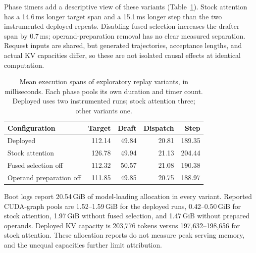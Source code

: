 Phase timers add a descriptive view of these variants (Table~\ref{tab:optimization-spans}). Stock attention has a 14.6\,ms longer target span and a 15.1\,ms longer step than the two instrumented deployed repeats. Disabling fused selection increases the drafter span by 0.7\,ms; operand-preparation removal has no clear measured separation. Request inputs are shared, but generated trajectories, acceptance lengths, and actual KV capacities differ, so these are not isolated causal effects at identical computation.

\begin{table}[t]
\caption{Mean execution spans of exploratory replay variants, in milliseconds. Each phase pools its own duration and timer count. Deployed uses two instrumented runs; stock attention three; other variants one.}
\label{tab:optimization-spans}
\centering\small
\setlength{\tabcolsep}{3pt}
\begin{tabular}{@{}lrrrr@{}}
\toprule
Configuration & Target & Draft & Dispatch & Step \\
\midrule
Deployed & 112.14 & 49.84 & 20.81 & 189.35 \\
Stock attention & 126.78 & 49.94 & 21.13 & 204.44 \\
Fused selection off & 112.32 & 50.57 & 21.08 & 190.38 \\
Operand preparation off & 111.85 & 49.85 & 20.75 & 188.97 \\
\bottomrule
\end{tabular}
\end{table}

Boot logs report 20.54\,GiB of model-loading allocation in every variant. Reported CUDA-graph pools are 1.52--1.59\,GiB for the deployed runs, 0.42--0.50\,GiB for stock attention, 1.97\,GiB without fused selection, and 1.47\,GiB without prepared operands. Deployed KV capacity is 203,776 tokens versus 197,632--198,656 for stock attention. These allocation reports do not measure peak serving memory, and the unequal capacities further limit attribution.
